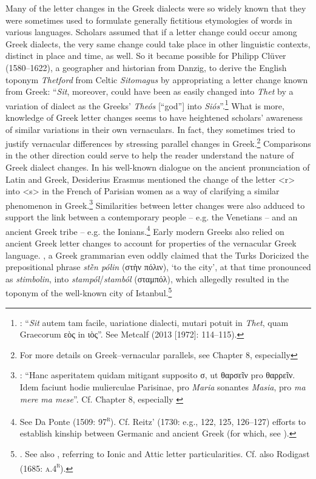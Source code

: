 Many of the letter changes in the Greek dialects were so widely known that they were sometimes used to formulate generally fictitious etymologies of words in various languages. Scholars assumed that if a letter change could occur among Greek dialects, the very same change could take place in other linguistic contexts, distinct in place and time, as well. So it became possible for Philipp Clüver (1580–1622), a geographer and historian from Danzig, to derive the English toponym \textit{Thetford} from Celtic \textit{Sitomagus} by appropriating a letter change known from Greek: “\textit{Sit}, moreover, could have been as easily changed into \textit{Thet} by a variation of dialect as the Greeks’ \textit{Theós} [“god”] into \textit{Siós}”.\footnote{{\citet[64]{Clüver1616}: “}{\textit{Sit}} {autem tam facile, uariatione dialecti, mutari potuit in} {\textit{Thet}}{, quam Graecorum \Theta εὸς in \Sigma ιὸς”. See Metcalf (2013 [1972]: 114–115).}} What is more, knowledge of Greek letter changes seems to have heightened scholars’ awareness of similar variations in their own vernaculars. In fact, they sometimes tried to justify vernacular differences by stressing parallel changes in Greek.\footnote{{For more details on Greek–vernacular parallels, see Chapter 8, especially }} Comparisons in the other direction could serve to help the reader understand the nature of Greek dialect changes. In his well-known dialogue on the ancient pronunciation of Latin and Greek, Desiderius Erasmus mentioned the change of the letter <r> into <s> in the French of Parisian women as a way of clarifying a similar phenomenon in Greek.\footnote{{\citet[52]{Erasmus1528}: “Hanc asperitatem quidam mitigant supposito σ, ut θαρσεῖν pro θαρρεῖν. Idem faciunt hodie mulierculae Parisinae, pro} {\textit{Maria}} {sonantes} {\textit{Masia}}{, pro} {\textit{ma mere ma mese}}{”. Cf. Chapter 8, especially }} Similarities between letter changes were also adduced to support the link between a contemporary people – e.g. the Venetians – and an ancient Greek tribe – e.g. the Ionians.\footnote{{See Da Ponte (1509: 97}{\textsc{\textsuperscript{r}}}{). Cf. Reitz’ (1730: e.g., 122, 125, 126–127) efforts to establish kinship between Germanic and ancient Greek (for which, see \citealt{VanHal2016}).}} Early modern Greeks also relied on ancient Greek letter changes to account for properties of the vernacular Greek language. \citealt{Around1650}, a Greek grammarian even oddly claimed that the Turks Doricized the prepositional phrase \textit{stḕn pólin} (στὴν πόλιν), ‘to the city’, at that time pronounced as \textit{stimbolin}, into \textit{stampól}/\textit{stamból} (σταμπόλ), which allegedly resulted in the toponym of the well-known city of Istanbul.\footnote{{\citet[14]{Nikiforos1908}. See also \citet[35]{Nikiforos1908}, referring to Ionic and Attic letter particularities. Cf.} also Rodigast (1685: \textsc{a.4}\textsc{\textsuperscript{r}}).}

